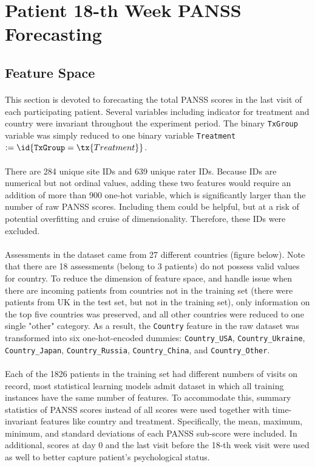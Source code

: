 \documentclass[11pt]{article}
\begin{document}
	\section{Patient 18-th Week PANSS Forecasting}
	\subsection{Feature Space}
	\paragraph{} This section is devoted to forecasting the total PANSS scores in the last visit of each participating patient. Several variables including indicator for treatment and country were invariant throughout the experiment period. The binary \texttt{TxGroup} variable was simply reduced to one binary variable \texttt{Treatment} $:= \id{\texttt{TxGroup} = \tx{Treatment}}$.
	
	\paragraph{} There are 284 unique site IDs and 639 unique rater IDs. Because IDs are numerical but not ordinal values, adding these two features would require an addition of more than 900 one-hot variable, which is significantly larger than the number of raw PANSS scores. Including them could be helpful, but at a risk of potential overfitting and cruise of dimensionality. Therefore, these IDs were excluded.
	\paragraph{} Assessments in the dataset came from 27 different countries (figure below). Note that there are 18 assessments (belong to 3 patients) do not possess valid values for country. To reduce the dimension of feature space, and handle issue when there are incoming patients from countries not in the training set (there were patients from UK in the test set, but not in the training set), only information on the top five countries was preserved, and all other countries were reduced to one single "other" category. As a result, the \texttt{Country} feature in the raw dataset was transformed into six one-hot-encoded dummies: \texttt{Country\_USA}, \texttt{Country\_Ukraine}, \texttt{Country\_Japan}, \texttt{Country\_Russia}, \texttt{Country\_China}, and \texttt{Country\_Other}.
	
	\paragraph{} Each of the 1826 patients in the training set had different numbers of visits on record, most statistical learning models admit dataset in which all training instances have the same number of features. To accommodate this, summary statistics of PANSS scores instead of all scores were used together with time-invariant features like country and treatment. Specifically, the mean, maximum, minimum, and standard deviations of each PANSS sub-score were included. In additional, scores at day 0 and the last visit before the 18-th week visit were used as well to better capture patient's psychological status.
\end{document}
